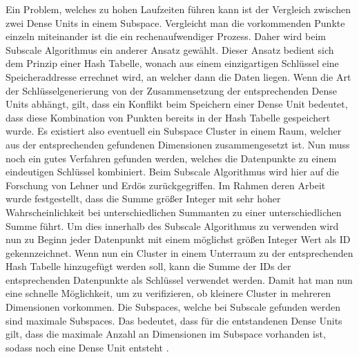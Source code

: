 \documentclass[utf8,biblatex]{lni}
\begin{document}
Ein Problem, welches zu hohen Laufzeiten führen kann ist der Vergleich zwischen zwei Dense Units in einem Subspace. 
Vergleicht man die vorkommenden Punkte einzeln miteinander ist die ein rechenaufwendiger Prozess. 
Daher wird beim Subscale Algorithmus ein anderer Ansatz gewählt. 
Dieser Ansatz bedient sich dem Prinzip einer Hash Tabelle, wonach aus einem einzigartigen Schlüssel eine Speicheraddresse errechnet wird, an welcher dann die Daten liegen. 
Wenn die Art der Schlüsselgenerierung von der Zusammensetzung der entsprechenden Dense Units abhängt, gilt, dass ein Konflikt beim Speichern einer Dense Unit bedeutet, dass diese Kombination von Punkten bereits in der Hash Tabelle gespeichert wurde. 
Es existiert also eventuell ein Subspace Cluster in einem Raum, welcher aus der entsprechenden gefundenen Dimensionen zusammengesetzt ist. 
Nun muss noch ein gutes Verfahren gefunden werden, welches die Datenpunkte zu einem eindeutigen Schlüssel kombiniert. 
Beim Subscale Algorithmus wird hier auf die Forschung von Lehner und Erdös zurückgegriffen. 
Im Rahmen deren Arbeit wurde festgestellt, dass die Summe größer Integer mit sehr hoher Wahrscheinlichkeit bei unterschiedlichen Summanten zu einer unterschiedlichen Summe führt. 
Um dies innerhalb des Subscale Algorithmus zu verwenden wird nun zu Beginn jeder Datenpunkt mit einem möglichst größen Integer Wert als ID gekennzeichnet. 
Wenn nun ein Cluster in einem Unterraum zu der entsprechenden Hash Tabelle hinzugefügt werden soll, kann die Summe der IDs der entsprechenden Datenpunkte als Schlüssel verwendet werden. 
Damit hat man nun eine schnelle Möglichkeit, um zu verifizieren, ob kleinere Cluster in mehreren Dimensionen vorkommen. 
Die Subspaces, welche bei Subscale gefunden werden sind maximale Subspaces. 
Das bedeutet, dass für die entstandenen Dense Units gilt, dass die maximale Anzahl an Dimensionen im Subspace vorhanden ist, sodass noch eine Dense Unit entsteht \Cite{ConferencePaper}. 
\end{document}
